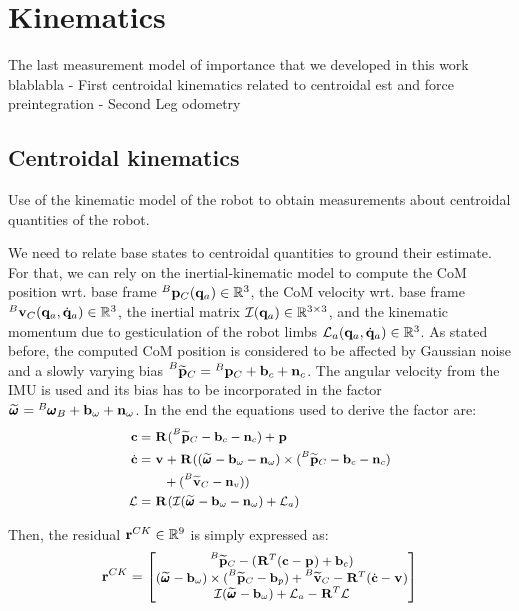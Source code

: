 \chapter{Kinematics}
\minitoc

The last measurement model of importance that we developed in this work blablabla
- First centroidal kinematics related to centroidal est and force preintegration
- Second Leg odometry


\section{Centroidal kinematics}
Use of the kinematic model of the robot to obtain measurements about centroidal quantities of the robot.

We need to relate base states to centroidal quantities to ground their estimate. 
For that, we can rely on the inertial-kinematic model to compute the CoM position wrt. base frame $\prescript{B}{}{{\bf p}}_{C}({\bf q}_a) \in \mathbb{R}^3$, the CoM velocity wrt. 
base frame $\prescript{B}{}{{\bf v}}_{C}({\bf q}_a, \dot{{\bf q}}_a) \in \mathbb{R}^3$, the inertial matrix $\mathcal{I}({\bf q}_a) \in \mathbb{R}^{3\times 3}$, and  the kinematic momentum due to gesticulation 
of the robot limbs $\mathcal{L}_a({\bf q}_a, \dot{{\bf q}}_a) \in \mathbb{R}^{3}$. 
As stated before, the computed CoM position is considered to be affected by Gaussian noise and a slowly varying bias $\prescript{B}{}{\widetilde{{\bf p}}}_{C} = \prescript{B}{}{{\bf p}}_{C} + {\bf b}_{c} + {\bf n}_c$. 
The angular velocity from the IMU is used and its bias has to be incorporated in the factor $\prescript{}{}{\widetilde{\pmb{\omega}}}_{} = \prescript{B}{}{\pmb{\omega}}_{B} + {\bf b}_{\omega} + {\bf n}_{\omega}$.  
In the end the equations used to derive the factor are:
%
\begin{equation}
\small
\begin{split}
{\bf c} &= \prescript{}{}{{\bf R}}_{} (\prescript{B}{}{\widetilde{{\bf p}}}_{C} -  {\bf b}_{c} - {\bf n}_{c}) + \prescript{}{}{{\bf p}}_{}
\\
\dot{{\bf c}} &= 
\prescript{}{}{{\bf v}}_{} + \prescript{}{}{{\bf R}}_{}((\prescript{}{}{\widetilde{\pmb{\omega}}}_{} - {\bf b}_{\omega} - {\bf n}_{\omega}) \times (\prescript{B}{}{\widetilde{{\bf p}}}_{C} -  {\bf b}_c - {\bf n}_c) 
\\&~~~~~~+ (\prescript{B}{}{\widetilde{{\bf v}}}_{C} - {\bf n}_{v}))
\\
\mathcal{L} &= \prescript{}{}{{\bf R}}_{}(\mathcal{I} (\prescript{}{}{\widetilde{\pmb{\omega}}}_{} - {\bf b}_{\omega} - {\bf n}_{\omega}) + \mathcal{L}_a)
\end{split}
\end{equation}

Then, the residual ${\bf r}^{CK} \in \mathbb{R}^9$ is simply expressed as:
%
\begin{equation}
\small
{\bf r}^{CK}=
\begin{bmatrix}
\prescript{B}{}{\widetilde{{\bf p}}}_{C} - (\prescript{}{}{{\bf R}}_{}^T({\bf c} - \prescript{}{}{{\bf p}}_{}) + {\bf b}_{c})
\\
(\prescript{}{}{\widetilde{\pmb{\omega}}}_{} - {\bf b}_{\omega}) \times (\prescript{B}{}{\widetilde{{\bf p}}}_{C} -  {\bf b}_{p}) + \prescript{B}{}{\widetilde{{\bf v}}}_{C} - \prescript{}{}{{\bf R}}_{}^T(\dot{{\bf c}} - \prescript{}{}{{\bf v}}_{})
\\
\mathcal{I} (\prescript{}{}{\widetilde{\pmb{\omega}}}_{} - {\bf b}_{\omega}) + \mathcal{L}_a - \prescript{}{}{{\bf R}}_{}^T\mathcal{L}
\end{bmatrix}
\label{eq:CKFactor}
\end{equation}




